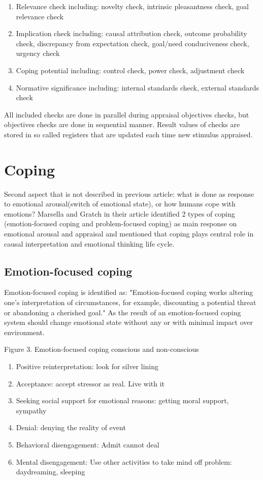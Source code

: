 \begin{enumerate}
	\item  Relevance check including: novelty check, intrinsic pleasantness check, goal relevance check
	\item  Implication check including: causal attribution check, outcome probability check, discrepancy from expectation check, goal/need conduciveness check, urgency check
	\item  Coping potential including: control check, power check, adjustment check
	\item  Normative significance including: internal standards check, external standards check
\end{enumerate}

All included checks are done in parallel during appraisal objectives checks, but objectives checks are done in sequential manner.
Result values of checks are stored in so called registers that are updated each time new stimulus appraised.

\section{Coping}

Second aspect that is not described in previous article: what is done as response to emotional arousal(switch of emotional state), or how humans cope with emotions?
Marsella and Gratch in their article \cite{dont_worry_be_happy} identified 2 types of coping (emotion-focused coping and problem-focused coping) as main response on emotional arousal and appraisal and mentioned that coping plays central role in causal interpretation and emotional thinking life cycle.

\subsection{Emotion-focused coping}

Emotion-focused coping is identified as: "Emotion-focused coping works altering one’s interpretation of circumstances, for example, discounting a potential threat or abandoning a cherished goal." As the result of an emotion-focused coping system should change emotional state without any or with minimal impact over environment.

\begin{enumerate}
Figure 3. Emotion-focused coping conscious and non-conscious
\end{enumerate}

\begin{enumerate}
	\item  Positive reinterpretation: look for silver lining
	\item  Acceptance: accept stressor as real. Live with it
	\item  Seeking  social  support  for  emotional  reasons: getting moral support, sympathy
	\item  Denial: denying the reality of event
	\item  Behavioral disengagement: Admit cannot deal
	\item  Mental  disengagement:  Use  other  activities  to take mind off problem: daydreaming, sleeping
\end{enumerate}

